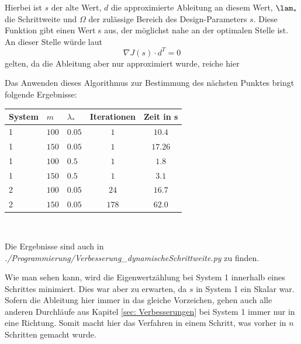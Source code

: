 \documentclass[a4paper,12pt]{report}
\newcommand{\1}{\mathds{1}}
\theoremstyle{plain} %
\theoremstyle{definition} %
\theoremstyle{remark}
\begin{document}
            Hierbei ist $s$ der alte Wert, $d$ die approximierte Ableitung an diesem Wert, $\lam_*$ die Schrittweite und $\Omega$ der zulässige Bereich des Design-Parameters $s$.
            Diese Funktion gibt einen Wert s aus, der möglichst nahe an der optimalen Stelle ist.
            An dieser Stelle würde laut \cite[S. 286]{optimierungBurkhard}
            $$\nabla J(s)\cdot d^T = 0$$ gelten, da die Ableitung aber nur approximiert wurde, reiche hier 


            Das Anwenden dieses Algorithmus zur Bestimmung des nächsten Punktes bringt folgende Ergebnisse:
            \begin{table}[!ht]
                  \centering
                  \begin{tabular}{lllcc}
                       System & $m$ & $\lambda_*$ & Iterationen & Zeit in s\\
                       \hline
                       1 & $100$ & $0.05$ & $1$ & $10.4$ \\ 
                       1 & $150$ & $0.05$ & $1$ & $17.26$ \\
                       \hline
                       1 & $100$ & $0.5$ & $1$ & $1.8$ \\
                       1 & $150$ & $0.5$ & $1$ & $3.1$ \\
                       \hline
                       2 & $100$ & $0.05$ & $24$ & $16.7$ \\
                       2 & $150$ & $0.05$ & $178$ & $62.0$ \\
                       \hline
                  \end{tabular}\\
                  \label{tab: Ergebnisse_dynamischSchritt}
            \end{table}

            Die Ergebnisse sind auch in \textit{./Programmierung/Verbesserung\_dynamischeSchrittweite.py} zu finden.

            Wie man sehen kann, wird die Eigenwertzählung bei System 1 innerhalb eines Schrittes minimiert.
            Dies war aber zu erwarten, da $s$ in System 1 ein Skalar war.
            Sofern die Ableitung hier immer in das gleiche Vorzeichen, gehen auch alle anderen Durchläufe aus Kapitel \ref{sec: Verbesserungen} bei System 1 immer nur in eine Richtung.
            Somit macht hier das Verfahren in einem Schritt, was vorher in $n$ Schritten gemacht wurde.
\end{document}
